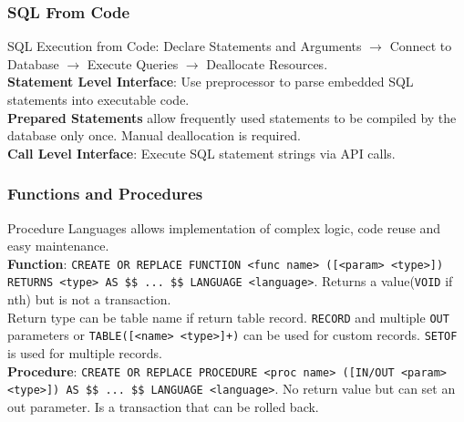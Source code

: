 \begin{multicols*}{3}
\subsubsection{SQL From Code}
SQL Execution from Code: Declare Statements and Arguments $\rightarrow$ Connect to Database $\rightarrow$ Execute Queries $\rightarrow$ Deallocate Resources.\\
\textbf{Statement Level Interface}: Use preprocessor to parse embedded SQL statements  into executable code.\\
\textbf{Prepared Statements} allow frequently used statements to be compiled by the database only once. Manual deallocation is required.\\
\textbf{Call Level Interface}: Execute SQL statement strings via API calls.\\ 

\subsubsection{Functions and Procedures}
Procedure Languages allows implementation of complex logic, code reuse and easy maintenance.\\
\textbf{Function}: \texttt{CREATE OR REPLACE FUNCTION <func name> ([<param> <type>]) RETURNS <type> AS \$\$ ... \$\$ LANGUAGE <language>}. Returns a value(\texttt{VOID} if nth) but is not a transaction.\\
Return type can be table name if return table record.  \texttt{RECORD} and multiple \texttt{OUT} parameters or \texttt{TABLE([<name> <type>]+)} can be used for custom records. \texttt{SETOF} is used for multiple records. \\
\textbf{Procedure}: \texttt{CREATE OR REPLACE PROCEDURE <proc name> ([IN/OUT <param> <type>]) AS \$\$ ... \$\$ LANGUAGE <language>}. No return value but can set an out parameter. Is a transaction that can be rolled back.\\


\end{multicols*}
